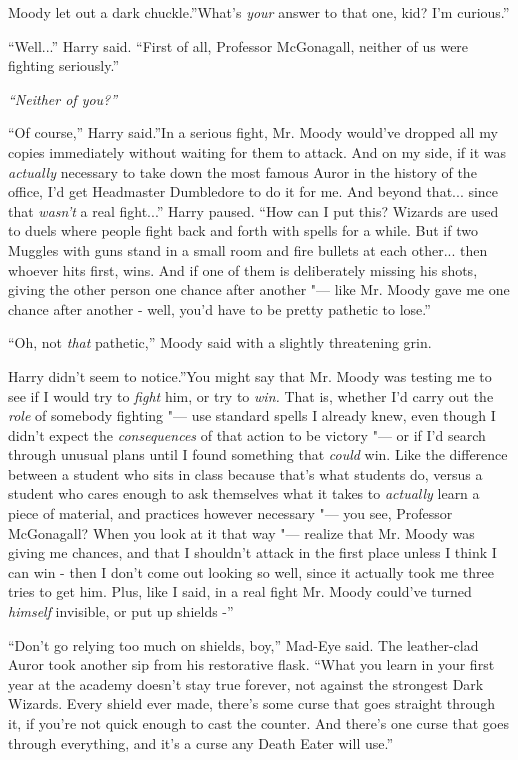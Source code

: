 Moody let out a dark chuckle.''What's \emph{your} answer to that one,
kid? I'm curious.''

``Well...'' Harry said. ``First of all, Professor McGonagall,
neither of us were fighting seriously.''

\emph{``Neither of you?''}

``Of course,'' Harry said.''In a serious fight, Mr. Moody would've
dropped all my copies immediately without waiting for them to attack.
And on my side, if it was \emph{actually} necessary to take down the
most famous Auror in the history of the office, I'd get Headmaster
Dumbledore to do it for me. And beyond that... since that
\emph{wasn't} a real fight...'' Harry paused. ``How can I put this?
Wizards are used to duels where people fight back and forth with spells
for a while. But if two Muggles with guns stand in a small room and fire
bullets at each other... then whoever hits first, wins. And if one
of them is deliberately missing his shots, giving the other person one
chance after another "--- like Mr. Moody gave me one chance after another -
well, you'd have to be pretty pathetic to lose.''

``Oh, not \emph{that} pathetic,'' Moody said with a slightly threatening
grin.

Harry didn't seem to notice.''You might say that Mr. Moody was testing
me to see if I would try to \emph{fight} him, or try to \emph{win.} That
is, whether I'd carry out the \emph{role} of somebody fighting "--- use
standard spells I already knew, even though I didn't expect the
\emph{consequences} of that action to be victory "--- or if I'd search
through unusual plans until I found something that \emph{could} win.
Like the difference between a student who sits in class because that's
what students do, versus a student who cares enough to ask themselves
what it takes to \emph{actually} learn a piece of material, and
practices however necessary "--- you see, Professor McGonagall? When you
look at it that way "--- realize that Mr. Moody was giving me chances, and
that I shouldn't attack in the first place unless I think I can win -
then I don't come out looking so well, since it actually took me three
tries to get him. Plus, like I said, in a real fight Mr. Moody could've
turned \emph{himself} invisible, or put up shields -''

``Don't go relying too much on shields, boy,'' Mad-Eye said. The
leather-clad Auror took another sip from his restorative flask. ``What
you learn in your first year at the academy doesn't stay true forever,
not against the strongest Dark Wizards. Every shield ever made, there's
some curse that goes straight through it, if you're not quick enough to
cast the counter. And there's one curse that goes through everything,
and it's a curse any Death Eater will use.''

